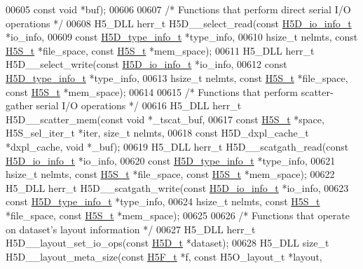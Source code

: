 \begin{DoxyCode}
00605     \textcolor{keyword}{const} \textcolor{keywordtype}{void} *buf);
00606 
00607 \textcolor{comment}{/* Functions that perform direct serial I/O operations */}
00608 H5\_DLL herr\_t H5D\_\_select\_read(\textcolor{keyword}{const} \hyperlink{struct_h5_d__io__info__t}{H5D\_io\_info\_t} *io\_info,
00609     \textcolor{keyword}{const} \hyperlink{struct_h5_d__type__info__t}{H5D\_type\_info\_t} *type\_info,
00610     hsize\_t nelmts, \textcolor{keyword}{const} \hyperlink{struct_h5_s__t}{H5S\_t} *file\_space, \textcolor{keyword}{const} \hyperlink{struct_h5_s__t}{H5S\_t} *mem\_space);
00611 H5\_DLL herr\_t H5D\_\_select\_write(\textcolor{keyword}{const} \hyperlink{struct_h5_d__io__info__t}{H5D\_io\_info\_t} *io\_info,
00612     \textcolor{keyword}{const} \hyperlink{struct_h5_d__type__info__t}{H5D\_type\_info\_t} *type\_info,
00613     hsize\_t nelmts, \textcolor{keyword}{const} \hyperlink{struct_h5_s__t}{H5S\_t} *file\_space, \textcolor{keyword}{const} \hyperlink{struct_h5_s__t}{H5S\_t} *mem\_space);
00614 
00615 \textcolor{comment}{/* Functions that perform scatter-gather serial I/O operations */}
00616 H5\_DLL herr\_t H5D\_\_scatter\_mem(\textcolor{keyword}{const} \textcolor{keywordtype}{void} *\_tscat\_buf,
00617     \textcolor{keyword}{const} \hyperlink{struct_h5_s__t}{H5S\_t} *space, H5S\_sel\_iter\_t *iter, \textcolor{keywordtype}{size\_t} nelmts,
00618     \textcolor{keyword}{const} H5D\_dxpl\_cache\_t *dxpl\_cache, \textcolor{keywordtype}{void} *\_buf);
00619 H5\_DLL herr\_t H5D\_\_scatgath\_read(\textcolor{keyword}{const} \hyperlink{struct_h5_d__io__info__t}{H5D\_io\_info\_t} *io\_info,
00620     \textcolor{keyword}{const} \hyperlink{struct_h5_d__type__info__t}{H5D\_type\_info\_t} *type\_info,
00621     hsize\_t nelmts, \textcolor{keyword}{const} \hyperlink{struct_h5_s__t}{H5S\_t} *file\_space, \textcolor{keyword}{const} \hyperlink{struct_h5_s__t}{H5S\_t} *mem\_space);
00622 H5\_DLL herr\_t H5D\_\_scatgath\_write(\textcolor{keyword}{const} \hyperlink{struct_h5_d__io__info__t}{H5D\_io\_info\_t} *io\_info,
00623     \textcolor{keyword}{const} \hyperlink{struct_h5_d__type__info__t}{H5D\_type\_info\_t} *type\_info,
00624     hsize\_t nelmts, \textcolor{keyword}{const} \hyperlink{struct_h5_s__t}{H5S\_t} *file\_space, \textcolor{keyword}{const} \hyperlink{struct_h5_s__t}{H5S\_t} *mem\_space);
00625 
00626 \textcolor{comment}{/* Functions that operate on dataset's layout information */}
00627 H5\_DLL herr\_t H5D\_\_layout\_set\_io\_ops(\textcolor{keyword}{const} \hyperlink{struct_h5_d__t}{H5D\_t} *dataset);
00628 H5\_DLL \textcolor{keywordtype}{size\_t} H5D\_\_layout\_meta\_size(\textcolor{keyword}{const} \hyperlink{struct_h5_f__t}{H5F\_t} *f, \textcolor{keyword}{const} H5O\_layout\_t *layout,

\end{DoxyCode}
